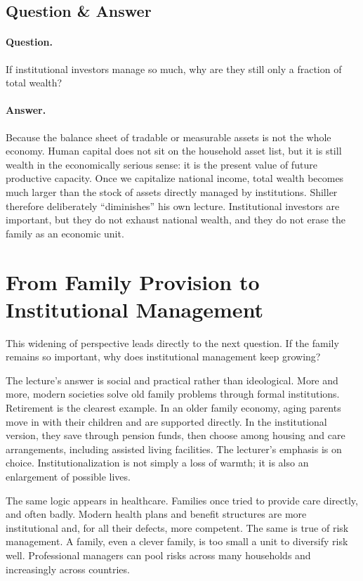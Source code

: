 \subsection{Question \& Answer}

\paragraph{Question.} If institutional investors manage so much, why are they still only a fraction of total wealth?

\paragraph{Answer.} Because the balance sheet of tradable or measurable assets is not the whole economy. Human capital does not sit on the household asset list, but it is still wealth in the economically serious sense: it is the present value of future productive capacity. Once we capitalize national income, total wealth becomes much larger than the stock of assets directly managed by institutions. Shiller therefore deliberately ``diminishes'' his own lecture. Institutional investors are important, but they do not exhaust national wealth, and they do not erase the family as an economic unit.

\section{From Family Provision to Institutional Management}

This widening of perspective leads directly to the next question. If the family remains so important, why does institutional management keep growing?

The lecture's answer is social and practical rather than ideological. More and more, modern societies solve old family problems through formal institutions. Retirement is the clearest example. In an older family economy, aging parents move in with their children and are supported directly. In the institutional version, they save through pension funds, then choose among housing and care arrangements, including assisted living facilities. The lecturer's emphasis is on choice. Institutionalization is not simply a loss of warmth; it is also an enlargement of possible lives.

The same logic appears in healthcare. Families once tried to provide care directly, and often badly. Modern health plans and benefit structures are more institutional and, for all their defects, more competent. The same is true of risk management. A family, even a clever family, is too small a unit to diversify risk well. Professional managers can pool risks across many households and increasingly across countries.

